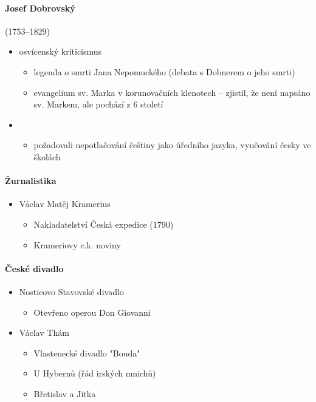 \paragraph{Josef Dobrovský} (1753--1829) 
\begin{itemize}
\item osvícenský kriticismus
	\begin{itemize}
	\item legenda o smrti Jana Nepomuckého (debata s Dobnerem o jeho smrti) 
	\item evangelium sv. Marka v korunovačních klenotech -- zjistil, že není napsáno sv. Markem, ale pochází z 6 století
	\end{itemize}
\item {}
	\begin{itemize}
	\item požadovali nepotlačování češtiny jako úředního jazyka, vyučování česky ve školách
	\end{itemize}
\end{itemize}

\paragraph{Žurnalistika}
\begin{itemize}
\item Václav Matěj Kramerius
	\begin{itemize}
	\item Nakladatelství Česká expedice (1790)
	\item Krameriovy c.k. noviny
	\end{itemize}
\end{itemize}

\paragraph{České divadlo}
\begin{itemize}
\item Nosticovo \ra Stavovské divadlo
	\begin{itemize}
	\item Otevřeno operou Don Giovanni
	\end{itemize}
\item Václav Thám
	\begin{itemize}
	\item Vlastenecké divadlo \ra "Bouda"
	\item U Hybernů (řád irských mnichů)
	\item Břetislav a Jitka
	\end{itemize}
\end{itemize}


